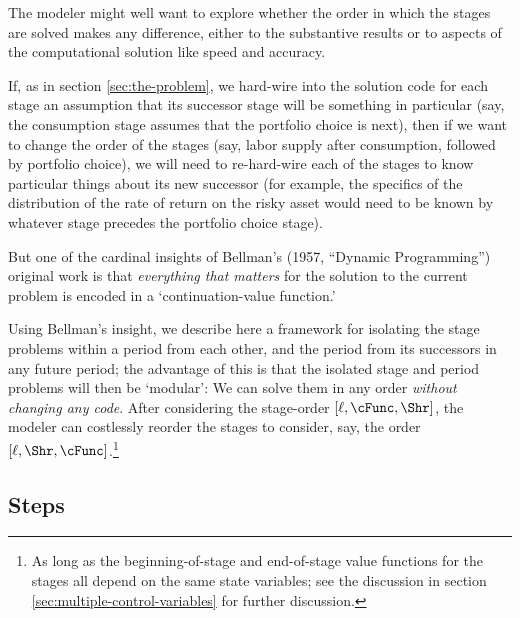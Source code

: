 \documentclass[titlepage, headings=optiontotocandhead]{Resources/texmf-local/tex/latex/econtex}
\begin{document}
The modeler might well want to explore whether the order in which the {stage}s are solved makes any difference, either to the substantive results or to aspects of the computational solution like speed and accuracy.

If, as in section \ref{sec:the-problem}, we hard-wire into the solution code for each {stage} an assumption that its successor {stage} will be something in particular (say, the consumption {stage} assumes that the portfolio choice is next), then if we want to change the order of the {stage}s (say, labor supply after consumption, followed by portfolio choice), we will need to re-hard-wire each of the stages to know particular things about its new successor (for example, the specifics of the distribution of the rate of return on the risky asset would need to be known by whatever {stage} precedes the portfolio choice {stage}).

But one of the cardinal insights of Bellman's (1957, ``Dynamic Programming'') original work is that \emph{everything that matters} for the solution to the current problem is encoded in a `continuation-value function.' %

Using Bellman's insight, we describe here a framework for isolating the {stage} problems within a {period} from each other, and the {period} from its successors in any future {period}; the advantage of this is that the isolated {stage} and {period} problems will then be `modular': We can solve them in any order \textit{without changing any code}. After considering the {stage}-order $[\ell,\cFunc,\Shr]$, the modeler can costlessly reorder the {stage}s to consider, say, the order $[\ell,\Shr,\cFunc]$.\footnote{As long as the beginning-of-{stage} and end-of-{stage} value functions for the {stage}s all depend on the same state variables; see the discussion in section \ref{sec:multiple-control-variables} for further discussion.}

\subsection{Steps}
\end{document}
